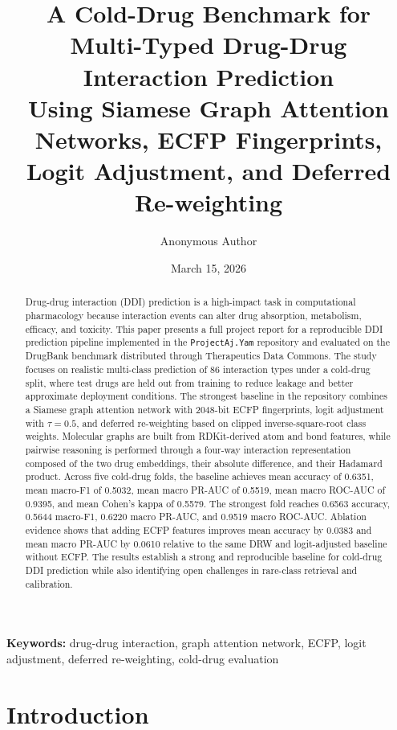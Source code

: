 \documentclass[12pt,a4paper]{report}
\title{A Cold-Drug Benchmark for Multi-Typed Drug-Drug Interaction Prediction\\Using Siamese Graph Attention Networks, ECFP Fingerprints,\\Logit Adjustment, and Deferred Re-weighting}
\author{Anonymous Author}
\date{March 15, 2026}
\begin{document}
\maketitle
{}

\begin{abstract}
Drug-drug interaction (DDI) prediction is a high-impact task in computational pharmacology because interaction events can alter drug absorption, metabolism, efficacy, and toxicity. This paper presents a full project report for a reproducible DDI prediction pipeline implemented in the \texttt{ProjectAj.Yam} repository and evaluated on the DrugBank benchmark distributed through Therapeutics Data Commons. The study focuses on realistic multi-class prediction of 86 interaction types under a cold-drug split, where test drugs are held out from training to reduce leakage and better approximate deployment conditions. The strongest baseline in the repository combines a Siamese graph attention network with 2048-bit ECFP fingerprints, logit adjustment with \(\tau = 0.5\), and deferred re-weighting based on clipped inverse-square-root class weights. Molecular graphs are built from RDKit-derived atom and bond features, while pairwise reasoning is performed through a four-way interaction representation composed of the two drug embeddings, their absolute difference, and their Hadamard product. Across five cold-drug folds, the baseline achieves mean accuracy of 0.6351, mean macro-F1 of 0.5032, mean macro PR-AUC of 0.5519, mean macro ROC-AUC of 0.9395, and mean Cohen's kappa of 0.5579. The strongest fold reaches 0.6563 accuracy, 0.5644 macro-F1, 0.6220 macro PR-AUC, and 0.9519 macro ROC-AUC. Ablation evidence shows that adding ECFP features improves mean accuracy by 0.0383 and mean macro PR-AUC by 0.0610 relative to the same DRW and logit-adjusted baseline without ECFP. The results establish a strong and reproducible baseline for cold-drug DDI prediction while also identifying open challenges in rare-class retrieval and calibration.
\end{abstract}

\noindent\textbf{Keywords:} drug-drug interaction, graph attention network, ECFP, logit adjustment, deferred re-weighting, cold-drug evaluation

\tableofcontents
\listoftables
\clearpage
{}

\chapter{Introduction}
\end{document}
